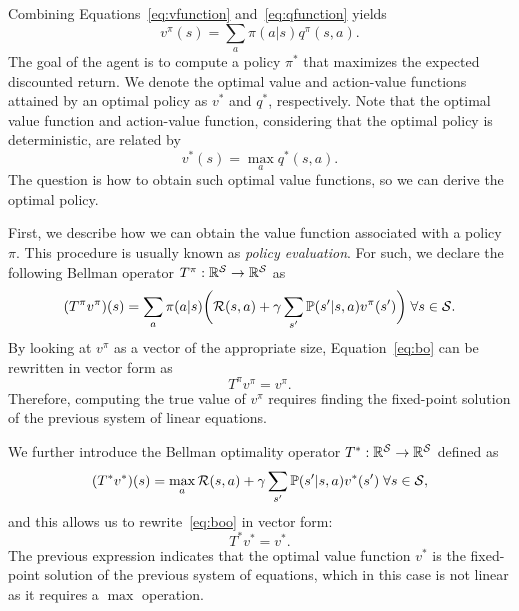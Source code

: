 \endgroup
Combining Equations~\eqref{eq:vfunction} and~\eqref{eq:qfunction} yields
\begin{equation}
  v^\pi(s) = \sum_a \pi(a\lvert s) q^\pi(s, a).
  \label{eq:rel_v_q}
\end{equation}
The goal of the agent is to compute a policy $\pi^*$ that maximizes the expected discounted return. We denote the optimal value and action-value functions attained by an optimal policy as $v^*$ and $q^*$, respectively. Note that the optimal value function and action-value function, considering that the optimal policy is deterministic, are related by
\begin{equation}
  v^*(s) = \max_a q^*(s, a).
  \label{eq:rel_v_q_opt}
\end{equation}
The question is how to obtain such optimal value functions, so we can derive the optimal policy.

First, we describe how we can obtain the value function associated with a policy $\pi$. This procedure is usually known as \textit{policy evaluation}. For such, we declare the following Bellman operator $T^\pi:\mathbb{R}^{\mathcal{S}}\rightarrow\mathbb{R}^{\mathcal{S}}$ as 
\begin{equation}
  (T^\pi v^\pi)(s) = \sum_a \pi(a\lvert s)\bigg(\mathcal{R}(s, a) + \gamma\sum_{s'} \mathbb{P}(s'\lvert s, a)v^\pi(s')\bigg)\;\forall s\in\mathcal{S}.
  \label{eq:bo}
\end{equation}
By looking at $v^\pi$ as a vector of the appropriate size, Equation~\ref{eq:bo} can be rewritten in vector form as 
\begin{equation}
  T^\pi v^\pi = v^\pi.
\end{equation}
Therefore, computing the true value of $v^\pi$ requires finding the fixed-point solution of the previous system of linear equations. 

We further introduce the Bellman optimality operator $T^*:\mathbb{R}^{\mathcal{S}}\rightarrow \mathbb{R}^{\mathcal{S}}$ defined as
\begin{equation}
  (T^* v^*)(s) = \max_a \mathcal{R}(s, a) + \gamma \sum_{s'} \mathbb{P}(s'\lvert s, a)v^*(s')\;\forall s\in\mathcal{S},
  \label{eq:boo}
\end{equation}
and this allows us to rewrite~\ref{eq:boo} in vector form:
\begin{equation}
  T ^* v^* = v^*.
  \label{eq:boo_vector}
\end{equation}
The previous expression indicates that the optimal value function $v^*$ is the fixed-point solution of the previous system of equations, which in this case is not linear as it requires a $\max$ operation. 


